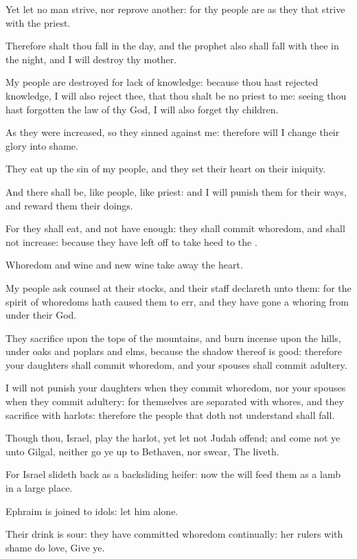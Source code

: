 \Verse Yet let no man strive, nor reprove another: for thy people are as they that strive with the priest.

\Verse Therefore shalt thou fall in the day, and the prophet also shall fall with thee in the night, and I will destroy thy mother.

\Verse My people are destroyed for lack of knowledge: because thou hast rejected knowledge, I will also reject thee, that thou shalt be no priest to me: seeing thou hast forgotten the law of thy God, I will also forget thy children.

\Verse As they were increased, so they sinned against me: therefore will I change their glory into shame.

\Verse They eat up the sin of my people, and they set their heart on their iniquity.

\Verse And there shall be, like people, like priest: and I will punish them for their ways, and reward them their doings.

\Verse For they shall eat, and not have enough: they shall commit whoredom, and shall not increase: because they have left off to take heed to the \LORD.

\Verse Whoredom and wine and new wine take away the heart.

\Verse My people ask counsel at their stocks, and their staff declareth unto them: for the spirit of whoredoms hath caused them to err, and they have gone a whoring from under their God.

\Verse They sacrifice upon the tops of the mountains, and burn incense upon the hills, under oaks and poplars and elms, because the shadow thereof is good: therefore your daughters shall commit whoredom, and your spouses shall commit adultery.

\Verse I will not punish your daughters when they commit whoredom, nor your spouses when they commit adultery: for themselves are separated with whores, and they sacrifice with harlots: therefore the people that doth not understand shall fall.

\Verse Though thou, Israel, play the harlot, yet let not Judah offend; and come not ye unto Gilgal, neither go ye up to Bethaven, nor swear, The \LORD liveth.

\Verse For Israel slideth back as a backsliding heifer: now the \LORD will feed them as a lamb in a large place.

\Verse Ephraim is joined to idols: let him alone.

\Verse Their drink is sour: they have committed whoredom continually: her rulers with shame do love, Give ye.


